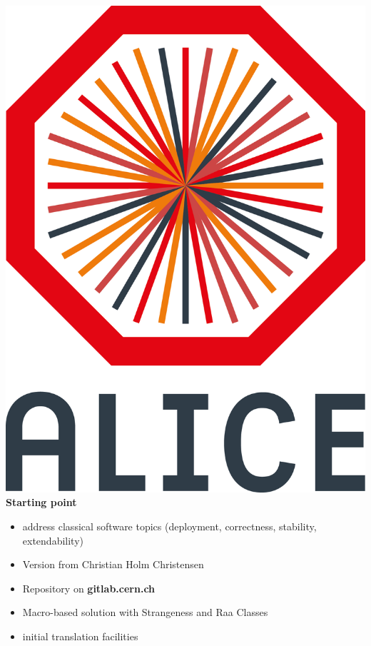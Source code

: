 \documentclass[aspectratio=1610,14pt,dvipsnames]{beamer}
\begin{document}
\begin{frame}{\includegraphics[height=0.07\textheight]{2012-Jul-04-4_Color_Logo_CB.png} \hspace{0.2cm}\textbf{Starting point}}
  \begin{itemize}
    \item address classical software topics (deployment, correctness, stability, extendability)
    \item Version from Christian Holm Christensen
    \item Repository on \textbf{gitlab.cern.ch}
    \item Macro-based solution with Strangeness and Raa Classes
    \item initial translation facilities
  \end{itemize}
\end{frame}
\end{document}
